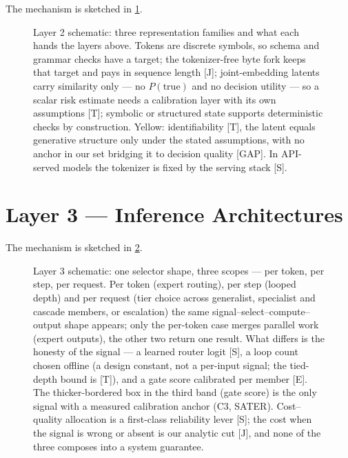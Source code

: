 \documentclass[11pt]{article}
\begin{document}
\noindent The mechanism is sketched in \cref{fig:layer2-reps}.
\begin{figure}[t]\centering
  \resizebox{\linewidth}{!}{}
  \caption{ Layer 2 schematic: three representation families and what each hands the layers above. Tokens are discrete symbols, so schema and grammar checks have a target; the tokenizer-free byte fork keeps that target and pays in sequence length [J]; joint-embedding latents carry similarity only --- no $P(\text{true})$ and no decision utility --- so a scalar risk estimate needs a calibration layer with its own assumptions [T]; symbolic or structured state supports deterministic checks by construction. Yellow: identifiability [T], the latent equals generative structure only under the stated assumptions, with no anchor in our set bridging it to decision quality [GAP]. In API-served models the tokenizer is fixed by the serving stack [S].}
  \label{fig:layer2-reps}
\end{figure}



\section{Layer 3 --- Inference Architectures}\label{sec:architectures}

\FloatBarrier

\noindent The mechanism is sketched in \cref{fig:layer3-route}.
\begin{figure}[t]\centering
  \resizebox{\linewidth}{!}{}
  \caption{ Layer 3 schematic: one selector shape, three scopes --- per token, per step, per request. Per token (expert routing), per step (looped depth) and per request (tier choice across generalist, specialist and cascade members, or escalation) the same signal--select--compute--output shape appears; only the per-token case merges parallel work (expert outputs), the other two return one result. What differs is the honesty of the signal --- a learned router logit [S], a loop count chosen offline (a design constant, not a per-input signal; the tied-depth bound is [T]), and a gate score calibrated per member [E]. The thicker-bordered box in the third band (gate score) is the only signal with a measured calibration anchor (C3, SATER). Cost--quality allocation is a first-class reliability lever [S]; the cost when the signal is wrong or absent is our analytic cut [J], and none of the three composes into a system guarantee.}
  \label{fig:layer3-route}
\end{figure}
\end{document}
